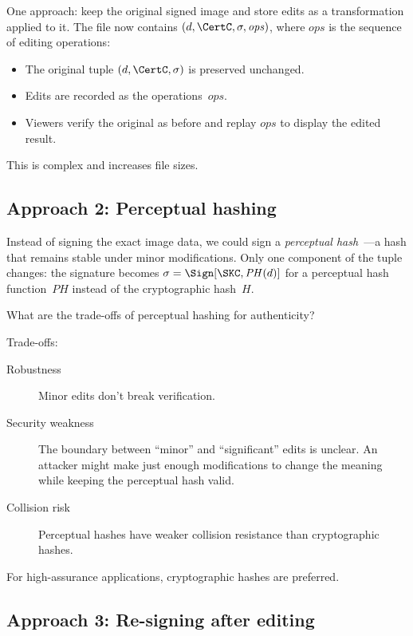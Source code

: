 One approach: keep the original signed image and store edits as a
transformation applied to it.
The file now contains \((d, \CertC, \sigma, \mathit{ops})\), where
\(\mathit{ops}\) is the sequence of editing operations:
\begin{itemize}
  \item The original tuple \((d, \CertC, \sigma)\) is preserved unchanged.
  \item Edits are recorded as the operations~\(\mathit{ops}\).
  \item Viewers verify the original as before and replay \(\mathit{ops}\)
    to display the edited result.
\end{itemize}

This is complex and increases file sizes.

\subsection{Approach 2: Perceptual hashing}

Instead of signing the exact image data, we could sign a
\emph{perceptual hash}~\autocite{SchneiderChang1996}---a hash that remains
stable under minor modifications.
Only one component of the tuple changes: the signature becomes
\(\sigma = \Sign[\SKC, \mathit{PH}(d)]\) for a perceptual hash
function~\(\mathit{PH}\) instead of the cryptographic hash~\(H\).

\begin{exercise}
  What are the trade-offs of perceptual hashing for authenticity?
\end{exercise}

Trade-offs:
\begin{description}
  \item[Robustness] Minor edits don't break verification.
  \item[Security weakness] The boundary between \enquote{minor} and
    \enquote{significant} edits is unclear.
    An attacker might make just enough modifications to change the
    meaning while keeping the perceptual hash valid.
  \item[Collision risk] Perceptual hashes have weaker collision resistance
    than cryptographic hashes.
\end{description}

For high-assurance applications, cryptographic hashes are preferred.

\subsection{Approach 3: Re-signing after editing}

